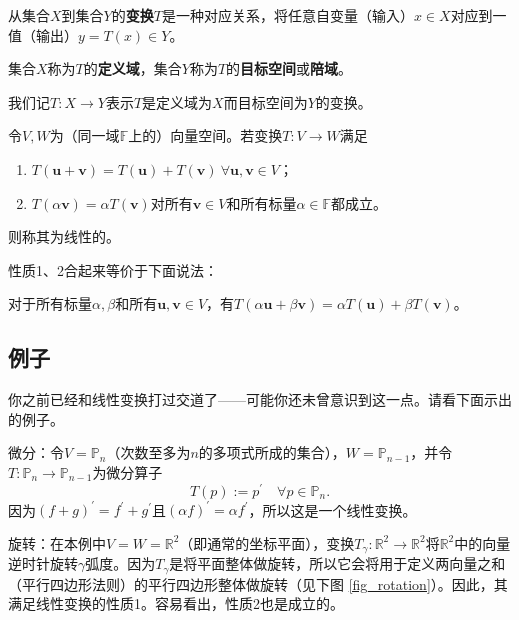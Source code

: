 从集合$X$到集合$Y$的\textbf{变换}$T$是一种对应关系，将任意自变量（输入）$x\in X$对应到一值（输出）$y=T(x)\in Y$。

集合$X$称为$T$的{\bf 定义域}，集合$Y$称为$T$的{\bf 目标空间}或{\bf 陪域}。

我们记$T:X\to Y$表示$T$是定义域为$X$而目标空间为$Y$的变换。

\begin{center}
\end{center}

\begin{definition*}
    令$V,W$为（同一域$\mathbb{F}$上的）向量空间。若变换$T:V\to W$满足
    \begin{enumerate}
        \item $T(\mathbf{u}+\mathbf{v})=T(\mathbf{u})+T(\mathbf{v})\ \forall\mathbf{u},\mathbf{v}\in V$；
        \item $T(\alpha\mathbf{v})=\alpha T(\mathbf{v})$对所有$\mathbf{v}\in V$和所有标量$\alpha\in \mathbb{F}$都成立。
    \end{enumerate}
    则称其为线性的。
\end{definition*}

性质1、2合起来等价于下面说法：
\begin{center}
    对于所有标量$\alpha,\beta$和所有$\mathbf{u},\mathbf{v}\in V$，有$T(\alpha\mathbf{u}+\beta\mathbf{v})=\alpha T(\mathbf{u})+\beta T(\mathbf{v})$。
\end{center}

\subsection{例子}

你之前已经和线性变换打过交道了——可能你还未曾意识到这一点。请看下面示出的例子。

\begin{example*}
    微分：令$V=\mathbb{P}_n$（次数至多为$n$的多项式所成的集合），$W=\mathbb{P}_{n-1}$，并令$T:\mathbb{P}_n\to \mathbb{P}_{n-1}$为微分算子
    \[T(p):=p^{\prime}\quad\forall p\in\mathbb{P}_n.\]
    因为$(f+g)^{\prime}=f^{\prime}+g^{\prime}$且$(\alpha f)^{\prime}=\alpha f^{\prime}$，所以这是一个线性变换。
\end{example*}

\begin{example*}
    旋转：在本例中$V=W=\mathbb{R}^2$（即通常的坐标平面），变换$T_{\gamma}:\mathbb{R}^2\to\mathbb{R}^2$将$\mathbb{R}^2$中的向量逆时针旋转$\gamma$弧度。因为$T_{\gamma}$是将平面整体做旋转，所以它会将用于定义两向量之和（平行四边形法则）的平行四边形整体做旋转（见下图 \ref{fig_rotation}）。因此，其满足线性变换的性质1。容易看出，性质2也是成立的。
\end{example*}


